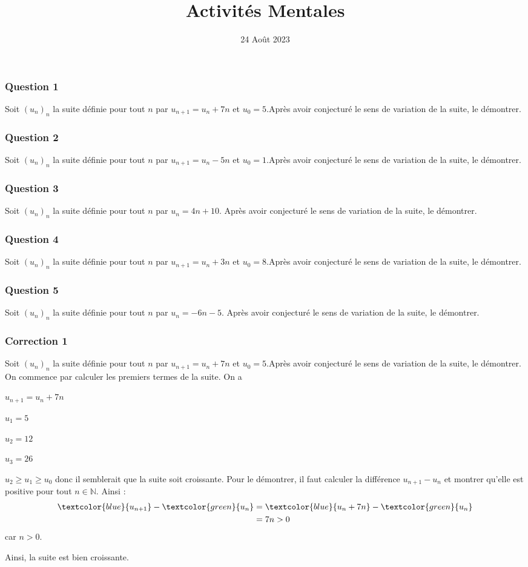 \documentclass[15pt, mathserif]{beamer}
\title{Activités Mentales}
\date{24 Août 2023}
\newcommand{\N}{\mathbb{N}}			%
\begin{document}
\begin{frame}
    \titlepage
\end{frame}

\begin{frame} 
	\frametitle{Question 1}
  
 Soit $(u_n)_n$ la suite définie pour tout $n$ par $u_{n+1}=u_n+7n$ et $u_0= 5$.Après avoir conjecturé le sens de variation de la suite, le démontrer.\end{frame}


\begin{frame} 
	\frametitle{Question 2}
  
 Soit $(u_n)_n$ la suite définie pour tout $n$ par $u_{n+1}=u_n-5n$ et $u_0= 1$.Après avoir conjecturé le sens de variation de la suite, le démontrer.\end{frame}


\begin{frame} 
	\frametitle{Question 3}
Soit $(u_n)_n$ la suite définie pour tout $n$ par $u_n=4n+10$. Après avoir conjecturé le sens de variation de la suite, le démontrer.\end{frame}


\begin{frame} 
	\frametitle{Question 4}
  
 Soit $(u_n)_n$ la suite définie pour tout $n$ par $u_{n+1}=u_n+3n$ et $u_0= 8$.Après avoir conjecturé le sens de variation de la suite, le démontrer.\end{frame}


\begin{frame} 
	\frametitle{Question 5}
Soit $(u_n)_n$ la suite définie pour tout $n$ par $u_n=-6n-5$. Après avoir conjecturé le sens de variation de la suite, le démontrer.\end{frame}


\begin{frame}
\vspace{-10mm}
	\frametitle{Correction 1}
\bigskip 
 Soit $(u_n)_n$ la suite définie pour tout $n$ par $u_{n+1}=u_n+7n$ et $u_0=5$.Après avoir conjecturé le sens de variation de la suite, le démontrer. On commence par calculer les premiers termes de la suite. On a 
 \begin{multicols}{4} 
 $u_{n+1}=u_n+7n$ 
 
  \columnbreak 
 
 $u_1=5$ 
 
 \columnbreak 
 
 $u_2=12$ 
 
 \columnbreak 
 
 $u_3=26$ 
  \end{multicols} $u_2 \geqslant u_1 \geqslant u_0$ donc il semblerait que la suite soit croissante. Pour le démontrer, il faut calculer la différence $u_{n+1} -u_n$ et montrer qu'elle est positive pour tout $n \in \N$. Ainsi : \begin{align*} \textcolor{blue}{u_{n+1}}-\textcolor{green}{u_n} &=\textcolor{blue}{  u_n+7n}-\textcolor{green}{u_n} \\ 
 &=7n >0 
 \end{align*} car $n>0$. 
 
 Ainsi, la suite est bien croissante. \end{frame}
\end{document}
